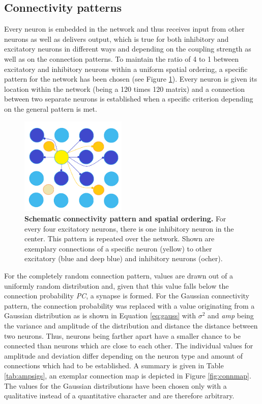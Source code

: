 \documentclass[14pt]{SelfArx} %
\numberwithin{equation}{section}
\begin{document}
\subsection{Connectivity patterns}
\label{sec:network}
Every neuron is embedded in the network and thus receives input from other neurons as well as delivers output, which is true for both inhibitory and excitatory neurons in different ways and depending on the coupling strength as well as on the connection patterns. \newline
To maintain the ratio of 4 to 1 between excitatory and inhibitory neurons within a uniform spatial ordering, a specific pattern for the network has been chosen (see Figure \ref{fig:connschema}). Every neuron is given its location within the network (being a 120 times  120 matrix) and a connection between two separate neurons is established when a specific criterion depending on the general pattern is met. 
\begin{figure} [htp]
\centering
\includegraphics[width = 0.45\textwidth]{connschema.png}
\caption{\textbf{Schematic connectivity pattern and spatial ordering.} For every four excitatory neurons, there is one inhibitory neuron in the center. This pattern is repeated over the network. Shown are exemplary connections of a specific neuron (yellow) to other excitatory (blue and deep blue) and inhibitory neurons (ocher).}
\label{fig:connschema}
\end{figure}
\newline
For the completely random connection pattern, values are drawn out of a uniformly random distribution and, given that this value falls below the connection probability \textit{PC}, a synapse is formed. \newline
For the Gaussian connectivity pattern, the connection probability was replaced with a value originating from a Gaussian distribution as is shown in Equation \ref{eq:gauss} with $\sigma^{2}$ and \textit{amp} being the variance and amplitude of the distribution and distance the distance between two neurons. Thus, neurons being farther apart have a smaller chance to be connected than neurons which are close to each other. The individual values for amplitude and deviation differ depending on the neuron type and amount of connections which had to be established. A summary is given in Table \ref{tab:ampsigs}, an exemplar connection map is depicted in Figure \ref{fig:connmap}. The values for the Gaussian distributions have been chosen only with a qualitative instead of a quantitative character and are therefore arbitrary.
\end{document}
